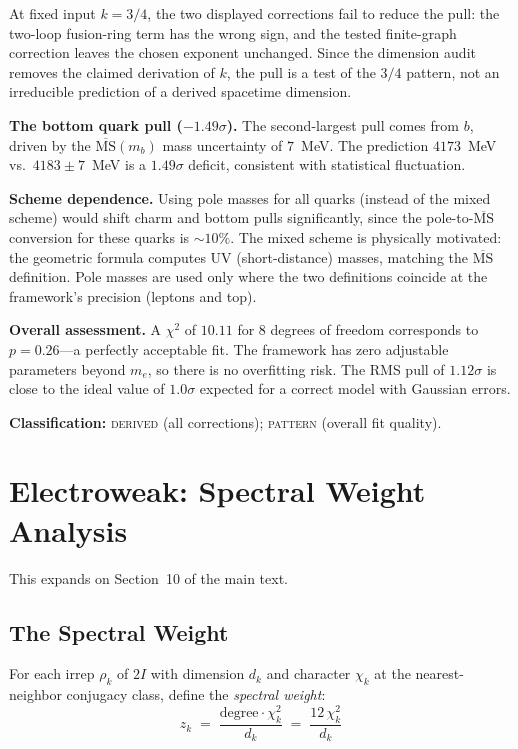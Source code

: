\documentclass[12pt,a4paper]{article}
\theoremstyle{definition}
\begin{document}
At fixed input $k=3/4$, the two displayed corrections fail to reduce the pull: the two-loop fusion-ring term has the wrong sign, and the tested finite-graph correction leaves the chosen exponent unchanged.  Since the dimension audit removes the claimed derivation of $k$, the pull is a test of the $3/4$ pattern, not an irreducible prediction of a derived spacetime dimension.

\textbf{The bottom quark pull ($-1.49\sigma$).}  The second-largest pull comes from $b$, driven by the $\overline{\text{MS}}(m_b)$ mass uncertainty of $7$~MeV.  The prediction $4173$~MeV vs.\ $4183 \pm 7$~MeV is a $1.49\sigma$ deficit, consistent with statistical fluctuation.

\textbf{Scheme dependence.}  Using pole masses for all quarks (instead of the mixed scheme) would shift charm and bottom pulls significantly, since the pole-to-$\overline{\text{MS}}$ conversion for these quarks is $\sim 10\%$.  The mixed scheme is physically motivated: the geometric formula computes UV (short-distance) masses, matching the $\overline{\text{MS}}$ definition.  Pole masses are used only where the two definitions coincide at the framework's precision (leptons and top).

\textbf{Overall assessment.}  A $\chi^2$ of $10.11$ for $8$ degrees of freedom corresponds to $p = 0.26$---a perfectly acceptable fit.  The framework has zero adjustable parameters beyond $m_e$, so there is no overfitting risk.  The RMS pull of $1.12\sigma$ is close to the ideal value of $1.0\sigma$ expected for a correct model with Gaussian errors.

\textbf{Classification:} \textsc{derived} (all corrections); \textsc{pattern} (overall fit quality).


\section{Electroweak: Spectral Weight Analysis}
\label{sec:S-ew}

This expands on Section~10 of the main text.

\subsection{The Spectral Weight}
\label{sec:S-spectral-weight}

For each irrep $\rho_k$ of $2I$ with dimension $d_k$ and character $\chi_k$ at the nearest-neighbor conjugacy class, define the \emph{spectral weight}:
\begin{equation}
z_k \;=\; \frac{\text{degree} \cdot \chi_k^2}{d_k} \;=\; \frac{12\,\chi_k^2}{d_k}
\end{equation}
\end{document}
